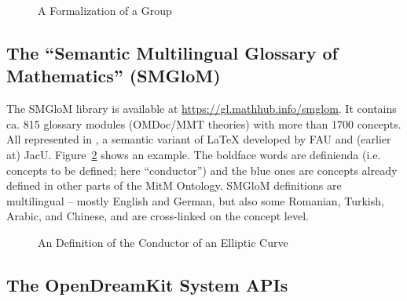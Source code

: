 \documentclass[book]{deliverablereport}
\begin{document}
\begin{figure}[ht]\centering
  \caption{A Formalization of a Group}\label{fig:mitm1}
\end{figure}

\subsection{The ``Semantic Multilingual Glossary of Mathematics'' (SMGloM)}\label{sec:smglom}
The SMGloM library is available at \url{https://gl.mathhub.info/smglom}. It contains
ca. 815 glossary modules (OMDoc/MMT theories) with more than 1700 concepts. All
represented in \sTeX, a semantic variant of {\LaTeX} developed by FAU and (earlier at)
JacU. Figure~\ref{fig:conductor} shows an example. The boldface words are definienda
(i.e. concepts to be defined; here ``conductor'') and the blue ones are concepts already
defined in other parts of the MitM Ontology. SMGloM definitions are multilingual -- mostly
English and German, but also some Romanian, Turkish, Arabic, and Chinese, and are
cross-linked on the concept level.

\begin{figure}[ht]\centering
  \caption{An \sTeX Definition of the Conductor of an Elliptic
    Curve}\label{fig:conductor}
\end{figure}

\subsection{The OpenDreamKit System APIs}\label{sec:sysapis}
\end{document}
